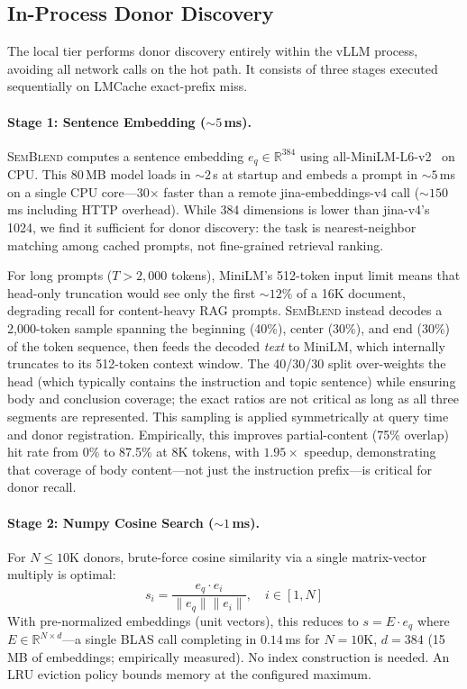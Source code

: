 \documentclass[10pt,twocolumn]{article}
\newcommand{\semblend}{\textsc{SemBlend}\xspace}
\begin{document}
\subsection{In-Process Donor Discovery}
\label{sec:design:embedding}
\label{sec:pipeline}

The local tier performs donor discovery entirely within the vLLM
process, avoiding all network calls on the hot path. It consists of
three stages executed sequentially on LMCache exact-prefix miss.

\paragraph{Stage 1: Sentence Embedding (${\sim}5$\,ms).}
\semblend computes a sentence embedding $e_q \in \mathbb{R}^{384}$
using all-MiniLM-L6-v2~\cite{minilm} on CPU. This 80\,MB model loads
in ${\sim}2$\,s at startup and embeds a prompt in ${\sim}5$\,ms on a
single CPU core---30$\times$ faster than a remote jina-embeddings-v4
call (${\sim}150$\,ms including HTTP overhead). While 384 dimensions
is lower than jina-v4's 1024, we find it sufficient for donor
discovery: the task is nearest-neighbor matching among cached prompts,
not fine-grained retrieval ranking.

For long prompts ($T > 2{,}000$ tokens), MiniLM's 512-token input
limit means that head-only truncation would see only the first
${\sim}12\%$ of a 16K document, degrading recall for content-heavy
RAG prompts. \semblend instead decodes a 2{,}000-token
sample spanning the beginning (40\%), center (30\%), and end (30\%)
of the token sequence, then feeds the decoded \emph{text} to MiniLM,
which internally truncates to its 512-token context window.
The 40/30/30 split over-weights the head (which typically contains
the instruction and topic sentence) while ensuring body and conclusion
coverage; the exact ratios are not critical as long as all three
segments are represented. This sampling is applied symmetrically
at query time and donor registration.
Empirically, this improves partial-content (75\% overlap) hit rate
from 0\% to 87.5\% at 8K tokens, with $1.95\times$ speedup,
demonstrating that coverage of body content---not just the instruction
prefix---is critical for donor recall.

\paragraph{Stage 2: Numpy Cosine Search (${\sim}1$\,ms).}
For $N \leq 10\text{K}$ donors, brute-force cosine similarity via
a single matrix-vector multiply is optimal:
\begin{equation}
  s_i = \frac{e_q \cdot e_i}{\|e_q\| \|e_i\|}, \quad i \in [1, N]
  \label{eq:cosine-local}
\end{equation}
With pre-normalized embeddings (unit vectors), this reduces to
$s = E \cdot e_q$ where $E \in \mathbb{R}^{N \times d}$---a single
BLAS call completing in $0.14$\,ms for $N{=}10\text{K}$, $d{=}384$
(15\,MB of embeddings; empirically measured). No index construction is needed. An LRU
eviction policy bounds memory at the configured maximum.
\end{document}
